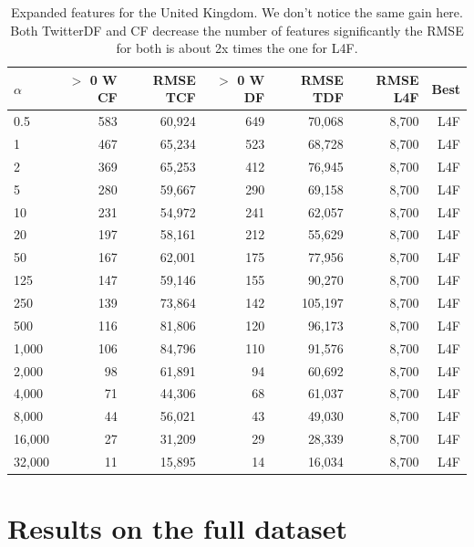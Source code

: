 \documentclass[minf,frontabs,twoside,singlespacing,parskip]{infthesis}
\begin{document}
\begin{table}[]
\begin{center}
\begin{tabular}{ l | r | r | r | r | r | r}
$\alpha$ & $>$ 0 W CF & RMSE TCF & $>$ 0 W DF & RMSE TDF & RMSE L4F & Best\\
\hline
0.5 & 583 & 60,924 & 649 & 70,068 & 8,700 & L4F\\
1 & 467 & 65,234 & 523 & 68,728 & 8,700 & L4F\\
2 & 369 & 65,253 & 412 & 76,945 & 8,700 & L4F\\
5 & 280 & 59,667 & 290 & 69,158 & 8,700 & L4F\\
10 & 231 & 54,972 & 241 & 62,057 & 8,700 & L4F\\
20 & 197 & 58,161 & 212 & 55,629 & 8,700 & L4F\\
50 & 167 & 62,001 & 175 & 77,956 & 8,700 & L4F\\
125 & 147 & 59,146 & 155 & 90,270 & 8,700 & L4F\\
250 & 139 & 73,864 & 142 & 105,197 & 8,700 & L4F\\
500 & 116 & 81,806 & 120 & 96,173 & 8,700 & L4F\\
1,000 & 106 & 84,796 & 110 & 91,576 & 8,700 & L4F\\
2,000 & 98 & 61,891 & 94 & 60,692 & 8,700 & L4F\\
4,000 & 71 & 44,306 & 68 & 61,037 & 8,700 & L4F\\
8,000 & 44 & 56,021 & 43 & 49,030 & 8,700 & L4F\\
16,000 & 27 & 31,209 & 29 & 28,339 & 8,700 & L4F\\
32,000 & 11 & 15,895 & 14 & 16,034 & 8,700 & L4F\\
\end{tabular}
\end{center}
\caption{Expanded features for the United Kingdom. We don't notice the same gain here. Both TwitterDF and CF decrease the number of features significantly the RMSE for both is about 2x times the one for L4F.}
\label{uk}
\end{table}

\newpage
\section{Results on the full dataset}

\end{document}
